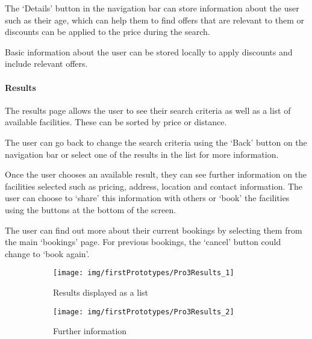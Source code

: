 The `Details' button in the navigation bar can store information about the user
such as their age, which can help them to find offers that are relevant to them
or discounts can be applied to the price during the search.

Basic information about the user can be stored locally to apply discounts and
include relevant offers.

\paragraph{Results}

The results page allows the user to see their search criteria as well as a list
of available facilities. These can be sorted by price or distance.

The user can go back to change the search criteria using the `Back' button on
the navigation bar or select one of the results in the list for more
information.

Once the user chooses an available result, they can see further information on
the facilities selected such as pricing, address, location and contact
information. The user can choose to `share' this information with others or
`book' the facilities using the buttons at the bottom of the screen.

The user can find out more about their current bookings by selecting them from
the main `bookings' page. For previous bookings, the `cancel' button could
change to `book again'.

\begin{figure}[htbp]
	\centering
	\begin{subfigure}[b]{0.45\textwidth}
		\texttt{[image: img/firstPrototypes/Pro3Results\_1]}
		\caption{Results displayed as a list}\label{fig:Pro3Results_1}
	\end{subfigure}%
	\qquad
	\begin{subfigure}[b]{0.45\textwidth}
		\texttt{[image: img/firstPrototypes/Pro3Results\_2]}
		\caption{Further information}\label{fig:Pro3Results_2}
	\end{subfigure}
	\caption{}\label{fig:Pro3Results}
\end{figure}

